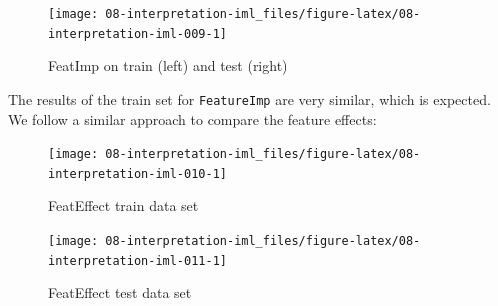 \documentclass[
]{scrbook}
\newenvironment{Shaded}{\begin{snugshade}}{\end{snugshade}}
\newcommand{\AttributeTok}[1]{\textcolor[rgb]{0.77,0.63,0.00}{#1}}
\newcommand{\FunctionTok}[1]{\textcolor[rgb]{0.00,0.00,0.00}{#1}}
\newcommand{\NormalTok}[1]{#1}
\newcommand{\OtherTok}[1]{\textcolor[rgb]{0.56,0.35,0.01}{#1}}
\newcommand{\SpecialCharTok}[1]{\textcolor[rgb]{0.00,0.00,0.00}{#1}}
\newcommand{\StringTok}[1]{\textcolor[rgb]{0.31,0.60,0.02}{#1}}
\renewenvironment{Shaded} {\begin{snugshade}\small} {\end{snugshade}}
\begin{document}
\begin{figure}

{\centering \texttt{[image: 08-interpretation-iml\_files/figure-latex/08-interpretation-iml-009-1]} 

}

\caption{FeatImp on train (left) and test (right)}\label{fig:08-interpretation-iml-009}
\end{figure}

The results of the train set for \texttt{FeatureImp} are very similar, which is expected.
We follow a similar approach to compare the feature effects:

\begin{Shaded}
\end{Shaded}

\begin{figure}

{\centering \texttt{[image: 08-interpretation-iml\_files/figure-latex/08-interpretation-iml-010-1]} 

}

\caption{FeatEffect train data set}\label{fig:08-interpretation-iml-010}
\end{figure}

\begin{Shaded}
\end{Shaded}

\begin{figure}

{\centering \texttt{[image: 08-interpretation-iml\_files/figure-latex/08-interpretation-iml-011-1]} 

}

\caption{FeatEffect test data set}\label{fig:08-interpretation-iml-011}
\end{figure}
\end{document}
